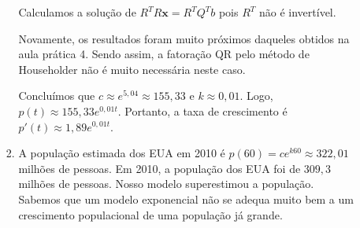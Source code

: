 \documentclass[11pt]{article}
\begin{document}
\begin{enumerate}
\begin{enumerate}[label=\arabic*)]
\begin{enumerate}[label=\alph*)]
                    Calculamos a solução de $R^TR\mathbf{x} = R^TQ^Tb$ pois $R^T$ não é invertível.
                    
                    Novamente, os resultados foram muito próximos daqueles obtidos na aula prática 4. Sendo assim, a fatoração QR pelo método de Householder não é muito necessária neste caso.
                    
                    Concluímos que $c \approx e^{5,04} \approx 155,33$ e $k \approx 0,01$. Logo, $p(t)\approx155,33e^{0,01t}$. Portanto, a taxa de crescimento é $p'(t) \approx 1,89e^{0,01t}$.
                    \bigbreak
                    \item A população estimada dos EUA em 2010 é $p(60) = ce^{k60} \approx 322,01$ milhões de pessoas. Em 2010, a população dos EUA foi de $309,3$ milhões de pessoas. Nosso modelo superestimou a população. Sabemos que um modelo exponencial não se adequa muito bem a um crescimento populacional de uma população já grande.
                    \bigbreak
                    
                \end{enumerate}
                
            \end{enumerate}
        
        
    \end{enumerate}
\end{document}
